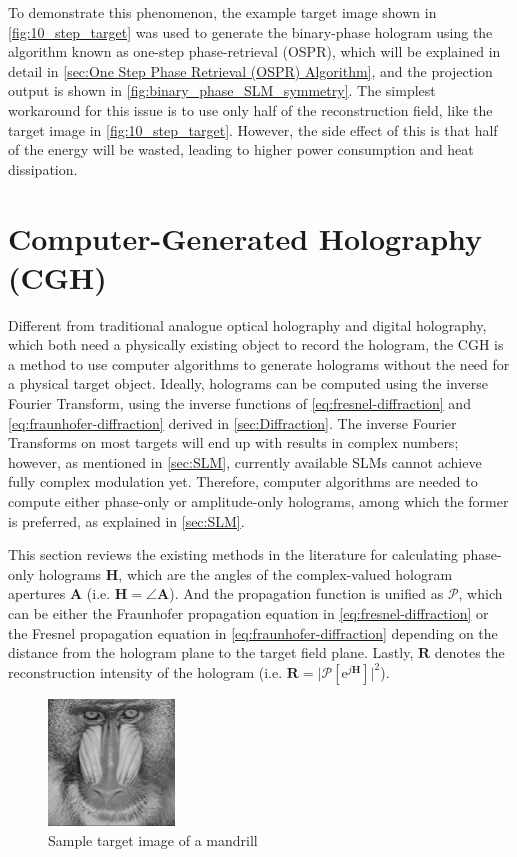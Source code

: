 To demonstrate this phenomenon, the example target image shown in \cref{fig:10_step_target} was used to generate the binary-phase hologram using the algorithm known as one-step phase-retrieval (OSPR), which will be explained in detail in \cref{sec:One Step Phase Retrieval (OSPR) Algorithm}, and the projection output is shown in \cref{fig:binary_phase_SLM_symmetry}. The simplest workaround for this issue is to use only half of the reconstruction field, like the target image in \cref{fig:10_step_target}. However, the side effect of this is that half of the energy will be wasted, leading to higher power consumption and heat dissipation.



\newpage
\section{Computer-Generated Holography (CGH)}\label{sec:cgh}
Different from traditional analogue optical holography and digital holography, which both need a physically existing object to record the hologram, the CGH is a method to use computer algorithms to generate holograms without the need for a physical target object. Ideally, holograms can be computed using the inverse Fourier Transform, using the inverse functions of \cref{eq:fresnel-diffraction} and \cref{eq:fraunhofer-diffraction} derived in \cref{sec:Diffraction}. The inverse Fourier Transforms on most targets will end up with results in complex numbers; however, as mentioned in \cref{sec:SLM}, currently available SLMs cannot achieve fully complex modulation yet. Therefore, computer algorithms are needed to compute either phase-only or amplitude-only holograms, among which the former is preferred, as explained in \cref{sec:SLM}.

This section reviews the existing methods in the literature for calculating phase-only holograms $\textbf{H}$, which are the angles of the complex-valued hologram apertures $\textbf{A}$ (i.e. $\textbf{H} = \angle \textbf{A}$). And the propagation function is unified as $\mathcal{P}$, which can be either the Fraunhofer propagation equation in \cref{eq:fresnel-diffraction} or the Fresnel propagation equation in \cref{eq:fraunhofer-diffraction} depending on the distance from the hologram plane to the target field plane. Lastly, $\textbf{R}$ denotes the reconstruction intensity of the hologram (i.e. $\textbf{R} = \vert \mathcal{P}[\mathrm{e}^{j\textbf{H}}] \vert ^2 $).

\begin{figure}[H]
  \centering
  \includegraphics[width=0.3\textwidth]{mandrill.png}
  \caption{Sample target image of a mandrill \cite{MANDRILL_REF}}\label{fig:mandrill.png}
\end{figure}

